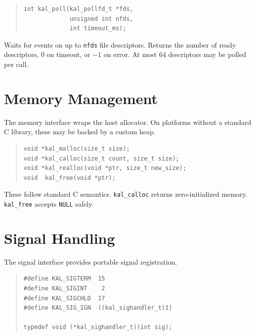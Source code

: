 \documentclass[11pt,twoside]{article}
\begin{document}
\begin{quote}
\begin{verbatim}
int kal_poll(kal_pollfd_t *fds,
             unsigned int nfds,
             int timeout_ms);
\end{verbatim}
\end{quote}

Waits for events on up to {\tt nfds} file descriptors.  Returns the
number of ready descriptors, $0$ on timeout, or $-1$ on error.  At
most 64 descriptors may be polled per call.

\newpage
\section{Memory Management}
\label{sec:memory}

The memory interface wraps the host allocator.  On platforms without
a standard C library, these may be backed by a custom heap.

\begin{quote}
\begin{verbatim}
void *kal_malloc(size_t size);
void *kal_calloc(size_t count, size_t size);
void *kal_realloc(void *ptr, size_t new_size);
void  kal_free(void *ptr);
\end{verbatim}
\end{quote}

These follow standard C semantics.  {\tt kal\_calloc} returns
zero-initialized memory.  {\tt kal\_free} accepts {\tt NULL} safely.

\newpage
\section{Signal Handling}
\label{sec:signal}

The signal interface provides portable signal registration.

\begin{quote}
\begin{verbatim}
#define KAL_SIGTERM  15
#define KAL_SIGINT    2
#define KAL_SIGCHLD  17
#define KAL_SIG_IGN  ((kal_sighandler_t)1)

typedef void (*kal_sighandler_t)(int sig);
\end{verbatim}
\end{quote}
\end{document}
